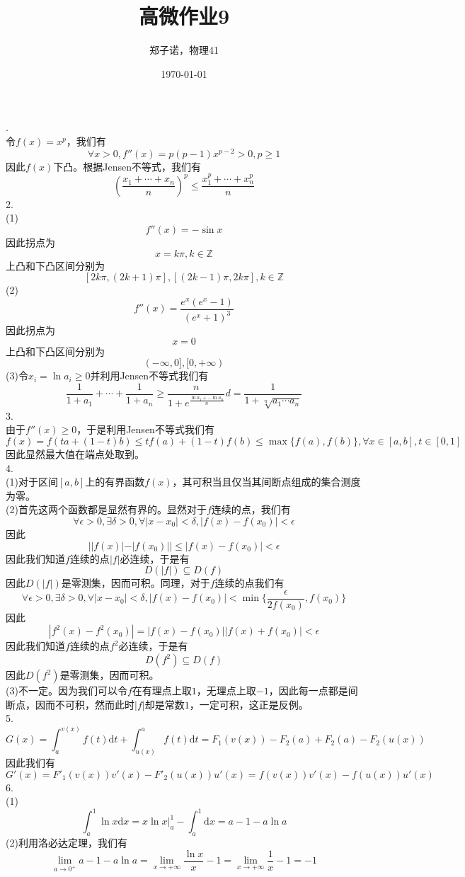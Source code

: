 \documentclass[utf8]{ctexart}
\title{高微作业9}
\author{郑子诺，物理41}
\date{\today}
\begin{document}
\maketitle
{}.\\
令$f(x)=x^p$，我们有
\[\forall x>0,f''(x)=p(p-1)x^{p-2}>0,p\ge1\]
因此$f(x)$下凸。根据Jensen不等式，我们有
\[(\frac{x_1+\cdots+x_n}{n})^p\le\frac{x_1^p+\cdots+x_n^p}{n}\]
2.\\
(1)\[f''(x)=-\sin x\]
因此拐点为
\[x=k\pi,k\in\mathbb{Z}\]
上凸和下凸区间分别为
\[[2k\pi,(2k+1)\pi],[(2k-1)\pi,2k\pi],k\in\mathbb{Z}\]
(2)
\[f''(x)=\frac{e^x(e^x-1)}{(e^x+1)^3}\]
因此拐点为
\[x=0\]
上凸和下凸区间分别为
\[(-\infty,0],[0,+\infty)\]
(3)令$x_i=\ln a_i\ge0$并利用Jensen不等式我们有
\[\frac{1}{1+a_1}+\cdots+\frac{1}{1+a_n}\ge\frac{n}{1+e^{\frac{\ln a_1+\cdots\ln a_n}{n}}}d=\frac{1}{1+\sqrt[n]{a_1\cdots a_n}}\]
3.\\
由于$f''(x)\ge0$，于是利用Jensen不等式我们有
\[f(x)=f(ta+(1-t)b)\le tf(a)+(1-t)f(b)\le\max\{f(a),f(b)\},\forall x\in[a,b],t\in[0,1]\]
因此显然最大值在端点处取到。\\
4.\\
(1)对于区间$[a,b]$上的有界函数$f(x)$，其可积当且仅当其间断点组成的集合测度为零。\\
(2)首先这两个函数都是显然有界的。显然对于$f$连续的点，我们有
\[\forall\epsilon>0,\exists\delta>0,\forall |x-x_0|<\delta,|f(x)-f(x_0)|<\epsilon\]
因此
\[||f(x)|-|f(x_0)||\le|f(x)-f(x_0)|<\epsilon\]
因此我们知道$f$连续的点$|f|$必连续，于是有
\[D(|f|)\subseteq D(f)\]
因此$D(|f|)$是零测集，因而可积。同理，对于$f$连续的点我们有
\[\forall\epsilon>0,\exists\delta>0,\forall |x-x_0|<\delta,|f(x)-f(x_0)|<\min\{\frac{\epsilon}{2f(x_0)},f(x_0)\}\]
因此
\[|f^2(x)-f^2(x_0)|=|f(x)-f(x_0)||f(x)+f(x_0)|<\epsilon\]
因此我们知道$f$连续的点$f^2$必连续，于是有
\[D(f^2)\subseteq D(f)\]
因此$D(f^2)$是零测集，因而可积。\\
(3)不一定。因为我们可以令$f$在有理点上取$1$，无理点上取$-1$，因此每一点都是间断点，因而不可积，然而此时$|f|$却是常数$1$，一定可积，这正是反例。\\
5.\\
\[G(x)=\int_{a}^{v(x)}f(t)\mathrm{d}t+\int_{u(x)}^{a}f(t)\mathrm{d}t=F_1(v(x))-F_2(a)+F_2(a)-F_2(u(x))\]
因此我们有
\[G'(x)=F'_1(v(x))v'(x)-F'_2(u(x))u'(x)=f(v(x))v'(x)-f(u(x))u'(x)\]
6.\\
(1)\[\int_{a}^{1}\ln x\mathrm{d}x=x\ln x|_a^{1}-\int_{a}^{1}\mathrm{d}x=a-1-a\ln a\]
(2)利用洛必达定理，我们有
\[\lim_{a\rightarrow0^+}a-1-a\ln a=\lim_{x\rightarrow+\infty}\frac{\ln x}{x}-1=\lim_{x\rightarrow+\infty}\frac{1}{x}-1=-1\]
\end{document}
